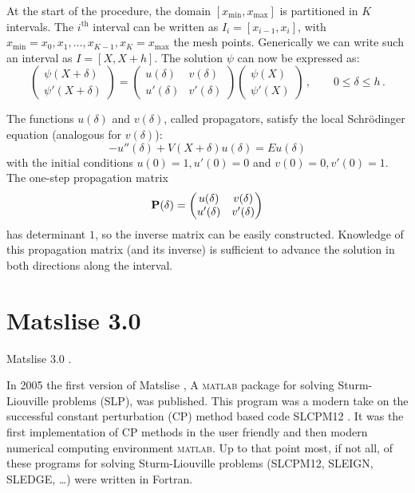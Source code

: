 At the start of the procedure, the domain \([x_\text{min}, x_\text{max}]\) is partitioned in \(K\) intervals. The $i^\text{th}$ interval can be written as $I_i = [x_{i-1}, x_{i}]$, with \(x_\text{min} = x_0, x_1, \dots, x_{K-1}, x_{K} = x_\text{max}\) the mesh points. Generically we can write such an interval as \(I = [X, X+h]\). The solution \(\psi\) can now be expressed as:
\begin{equation}
    \begin{pmatrix}\psi(X+\delta) \\ \psi'(X+\delta)\end{pmatrix}
    = \begin{pmatrix} u(\delta) & v(\delta) \\ u'(\delta) & v'(\delta) \end{pmatrix} \begin{pmatrix} \psi(X) \\ \psi'(X) \end{pmatrix} \,, \qquad %
    0 \leq \delta \leq h \,. \label{equ:c2_cpm_propmatrix}
\end{equation}

The functions \(u(\delta)\) and \(v(\delta)\), called propagators,
satisfy the local Schrödinger equation (analogous for \(v(\delta)\)):
\begin{equation}
    - u''(\delta) + V(X+\delta) u(\delta) = E u(\delta) \label{sequ:c2_local_schrodinger}
\end{equation}
with the initial conditions \(u(0) = 1, u'(0)=0\) and
\(v(0) = 0, v'(0)=1\). The one-step propagation matrix
$$
    \vb{P}(\delta) = \begin{pmatrix} u(\delta) & v(\delta) \\ u'(\delta) & v'(\delta) \end{pmatrix}
$$
has determinant \(1\), so the inverse matrix can be easily constructed. Knowledge of this propagation matrix (and its inverse) is sufficient to advance the solution in both directions along the interval.


\section{Matslise 3.0}


Matslise 3.0 \cite{baeyens_fast_2020}.

In 2005 the first version of Matslise \cite{ledoux_matslise_2005}, A \textsc{matlab} package for solving Sturm-Liouville problems (SLP), was published. This program was a modern take on the successful
constant perturbation (CP) method based code SLCPM12 \cite{ixaru_slcpm12_1999}. It was the first implementation of CP
methods in the user friendly and then modern numerical computing environment \textsc{matlab}. Up to that
point most, if not all, of these programs for solving Sturm-Liouville problems (SLCPM12, SLEIGN, SLEDGE, \ldots) \cite{ixaru_slcpm12_1999,bailey_sleign2_2001,eastham_sledge_1996}
were written in Fortran.

